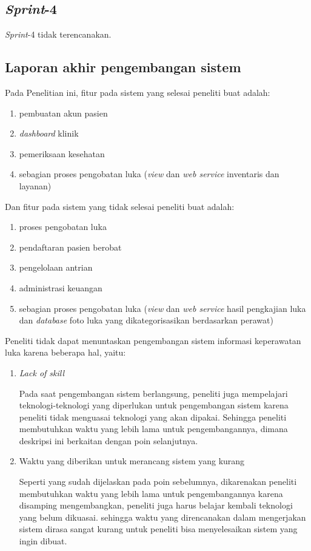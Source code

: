 \subsection{\emph{Sprint}-4}

\emph{Sprint}-4 tidak terencanakan.

\subsection{Laporan akhir pengembangan sistem}
Pada Penelitian ini, fitur pada sistem yang selesai peneliti buat adalah:

\begin{enumerate}
	\item pembuatan akun pasien
	\item \emph{dashboard} klinik
	\item pemeriksaan kesehatan
	\item sebagian proses pengobatan luka (\emph{view} dan \emph{web service} inventaris dan layanan)
\end{enumerate}

Dan fitur pada sistem yang tidak selesai peneliti buat adalah:

\begin{enumerate}
	\item proses pengobatan luka
	\item pendaftaran pasien berobat
	\item pengelolaan antrian
	\item administrasi keuangan
	\item sebagian proses pengobatan luka (\emph{view} dan \emph{web service} hasil pengkajian luka dan \emph{database} foto luka yang dikategorisasikan berdasarkan perawat)
\end{enumerate}

Peneliti tidak dapat menuntaskan pengembangan sistem informasi keperawatan luka karena beberapa hal, yaitu:

\begin{enumerate}
	\item \emph{Lack of skill}
	
	Pada saat pengembangan sistem berlangsung, peneliti juga mempelajari teknologi-teknologi yang diperlukan untuk pengembangan sistem karena peneliti tidak menguasai teknologi yang akan dipakai. Sehingga peneliti membutuhkan waktu yang lebih lama untuk pengembangannya, dimana deskripsi ini berkaitan dengan poin selanjutnya.
	
	\item Waktu yang diberikan untuk merancang sistem yang kurang
	
	Seperti yang sudah dijelaskan pada poin sebelumnya, dikarenakan peneliti membutuhkan waktu yang lebih lama untuk pengembangannya karena  disamping mengembangkan, peneliti juga harus belajar kembali teknologi yang belum dikuasai. sehingga waktu yang direncanakan dalam mengerjakan sistem dirasa sangat kurang untuk peneliti bisa menyelesaikan sistem yang ingin dibuat.
	
\end{enumerate}

